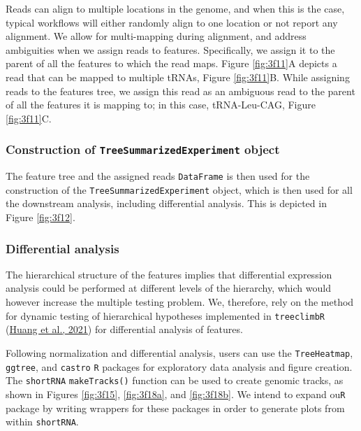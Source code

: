 \documentclass[12pt,twoside]{reedthesis}
\begin{document}
Reads can align to multiple locations in the genome, and when this is
the case, typical workflows will either randomly align to one location
or not report any alignment. We allow for multi-mapping during
alignment, and address ambiguities when we assign reads to features.
Specifically, we assign it to the parent of all the features to which
the read maps. Figure \ref{fig:3f11}A depicts a read that can be mapped to multiple
tRNAs, Figure \ref{fig:3f11}B. While assigning reads to the features tree, we assign
this read as an ambiguous read to the parent of all the features it is
mapping to; in this case, tRNA-Leu-CAG, Figure \ref{fig:3f11}C.



\hypertarget{construction-of-treesummarizedexperiment-object}{%
\subsubsection{\texorpdfstring{Construction of \texttt{TreeSummarizedExperiment} object}{Construction of TreeSummarizedExperiment object}}\label{construction-of-treesummarizedexperiment-object}}

The feature tree and the assigned reads \texttt{DataFrame} is then used for the
construction of the \texttt{TreeSummarizedExperiment} object, which is then used
for all the downstream analysis, including differential analysis. This
is depicted in Figure \ref{fig:3f12}.



\hypertarget{differential-analysis}{%
\subsubsection{Differential analysis}\label{differential-analysis}}

The hierarchical structure of the features implies that differential
expression analysis could be performed at different levels of the
hierarchy, which would however increase the multiple testing problem.
We, therefore, rely on the method for dynamic testing of hierarchical
hypotheses implemented in \texttt{treeclimbR} (\protect\hyperlink{ref-huang2021}{Huang et al., 2021}) for differential
analysis of features.

Following normalization and differential analysis, users can use the
\texttt{TreeHeatmap}, \texttt{ggtree}, and \texttt{castro} \texttt{R} packages for exploratory data analysis
and figure creation. The \texttt{shortRNA} \texttt{makeTracks()} function can be used to
create genomic tracks, as shown in Figures \ref{fig:3f15}, \ref{fig:3f18a}, and \ref{fig:3f18b}. We intend to
expand ou\texttt{R} package by writing wrappers for these packages in order to
generate plots from within \texttt{shortRNA}.
\end{document}

